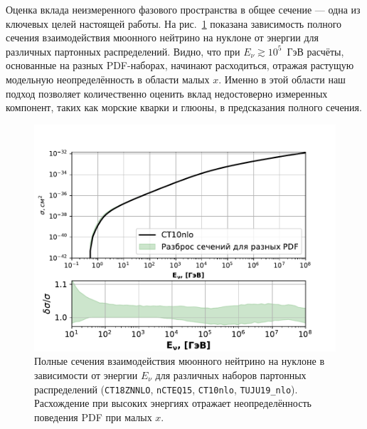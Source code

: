 Оценка вклада неизмеренного фазового пространства в общее сечение — одна из ключевых целей настоящей работы. На рис.~\ref{fig:xsec_total} показана зависимость полного сечения взаимодействия мюонного нейтрино на нуклоне от энергии для различных партонных распределений. Видно, что при $E_\nu \gtrsim 10^5$~ГэВ расчёты, основанные на разных PDF-наборах, начинают расходиться, отражая растущую модельную неопределённость в области малых $x$. Именно в этой области наш подход позволяет количественно оценить вклад недостоверно измеренных компонент, таких как морские кварки и глюоны, в предсказания полного сечения.

\begin{figure}[!h]
\centering
\includegraphics[width=\linewidth]{images/NuProp/xs_vs_enu.pdf}
\caption{Полные сечения взаимодействия мюонного нейтрино на нуклоне в зависимости от энергии $E_\nu$ для различных наборов партонных распределений (\texttt{CT18ZNNLO}, \texttt{nCTEQ15}, \texttt{CT10nlo}, \texttt{TUJU19\_nlo}). Расхождение при высоких энергиях отражает неопределённость поведения PDF при малых $x$.} 
\label{fig:xsec_total}
\end{figure}
